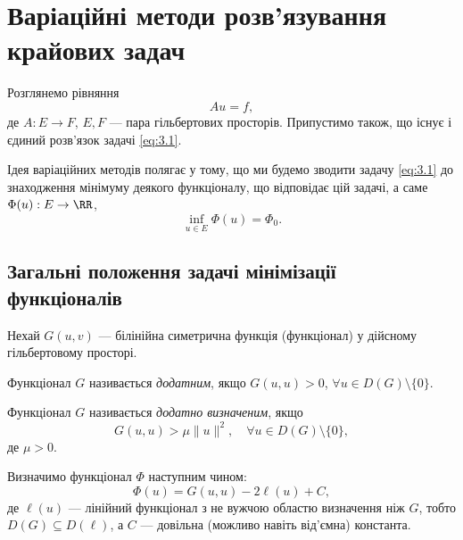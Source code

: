 \section{Варіаційні методи розв'язування крайових задач}

Розглянемо рівняння
\begin{equation}
    \label{eq:3.1}
    A u = f,
\end{equation}
де $A: E \to F$, $E, F$ --- пара гільбертових просторів. Припустимо також, що існує і єдиний розв'язок задачі \eqref{eq:3.1}. \medskip

Ідея варіаційних методів полягає у тому, що ми будемо зводити задачу \eqref{eq:3.1} до знаходження мінімуму деякого функціоналу, що відповідає цій задачі, а саме $\Phi(u): E \to \RR$,
\begin{equation}
    \label{eq:3.2}
    \inf_{u \in E} \Phi(u) = \Phi_0.
\end{equation}

\subsection{Загальні положення задачі мінімізації функціоналів}

Нехай $G(u, v)$ --- білінійна симетрична функція (функціонал) у дійсному гільбертовому просторі.

\begin{definition}
    Функціонал $G$ називається \textit{додатним}, якщо $G(u, u) > 0$, $\forall u \in D(G) \setminus \{0\}$.
\end{definition}

\begin{definition}
    Функціонал $G$ називається \textit{додатно визначеним}, якщо
    \begin{equation}
        \label{eq:3.3}
        G(u, u) > \mu \|u\|^2, \quad \forall u \in D(G) \setminus \{0\},
    \end{equation}
    де $\mu > 0$.
\end{definition}

Визначимо функціонал $\Phi$ наступним чином:
\begin{equation}
    \label{eq:3.4}
    \Phi(u) = G(u,u) - 2 \ell(u) + C,
\end{equation}
де $\ell(u)$ --- лінійний функціонал з не вужчою областю визначення ніж $G$, тобто $D(G) \subseteq D(\ell)$, а $C$ --- довільна (можливо навіть від'ємна) константа.

